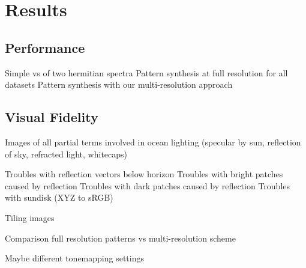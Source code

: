 \chapter{Results}
\label{ch:results}

\section{Performance}

Simple \InvFourierTransform vs \InvFourierTransform of two hermitian spectra
Pattern synthesis at full resolution for all datasets
Pattern synthesis with our multi-resolution approach

\section{Visual Fidelity}

Images of all partial terms involved in ocean lighting (specular by sun,
reflection of sky, refracted light, whitecaps)

Troubles with reflection vectors below horizon
Troubles with bright patches caused by reflection
Troubles with dark patches caused by reflection
Troubles with sundisk (XYZ to sRGB)

Tiling images

Comparison full resolution patterns vs multi-resolution scheme

Maybe different tonemapping settings